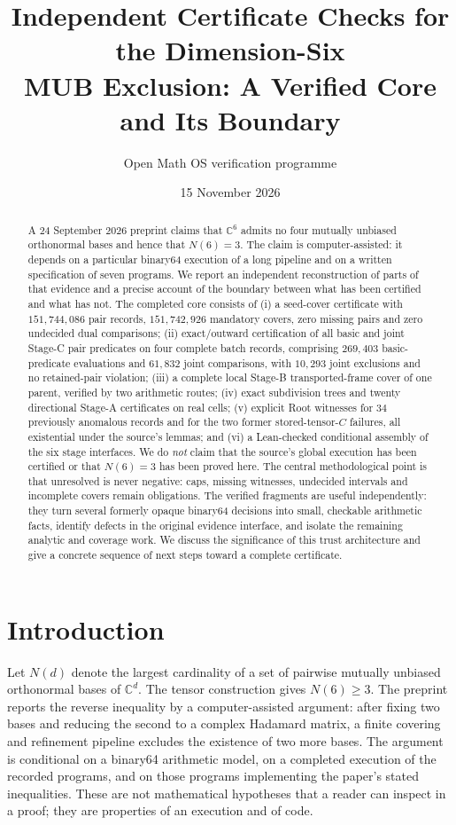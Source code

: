 \documentclass[10pt]{article}
\title{\bfseries Independent Certificate Checks for the Dimension-Six\\[2pt]
MUB Exclusion: A Verified Core and Its Boundary}
\author{Open Math OS verification programme}
\date{15 November 2026}
\theoremstyle{definition}
\newcommand{\C}{\mathbb C}
\begin{document}
\maketitle

\begin{abstract}A 24 September 2026 preprint claims that $\C^6$ admits no four mutually unbiased orthonormal bases and hence that $N(6)=3$. The claim is computer-assisted: it depends on a particular binary64 execution of a long pipeline and on a written specification of seven programs. We report an independent reconstruction of parts of that evidence and a precise account of the boundary between what has been certified and what has not. The completed core consists of (i) a seed-cover certificate with $151{,}744{,}086$ pair records, $151{,}742{,}926$ mandatory covers, zero missing pairs and zero undecided dual comparisons; (ii) exact/outward certification of all basic and joint Stage-C pair predicates on four complete batch records, comprising $269{,}403$ basic-predicate evaluations and $61{,}832$ joint comparisons, with $10{,}293$ joint exclusions and no retained-pair violation; (iii) a complete local Stage-B transported-frame cover of one parent, verified by two arithmetic routes; (iv) exact subdivision trees and twenty directional Stage-A certificates on real cells; (v) explicit Root witnesses for $34$ previously anomalous records and for the two former stored-tensor-$C$ failures, all existential under the source's lemmas; and (vi) a Lean-checked conditional assembly of the six stage interfaces. We do \emph{not} claim that the source's global execution has been certified or that $N(6)=3$ has been proved here. The central methodological point is that unresolved is never negative: caps, missing witnesses, undecided intervals and incomplete covers remain obligations. The verified fragments are useful independently: they turn several formerly opaque binary64 decisions into small, checkable arithmetic facts, identify defects in the original evidence interface, and isolate the remaining analytic and coverage work. We discuss the significance of this trust architecture and give a concrete sequence of next steps toward a complete certificate.
\end{abstract}

\section{Introduction}

Let $N(d)$ denote the largest cardinality of a set of pairwise mutually unbiased orthonormal bases of $\C^d$. The tensor construction gives $N(6)\ge 3$. The preprint \cite{source} reports the reverse inequality by a computer-assisted argument: after fixing two bases and reducing the second to a complex Hadamard matrix, a finite covering and refinement pipeline excludes the existence of two more bases. The argument is conditional on a binary64 arithmetic model, on a completed execution of the recorded programs, and on those programs implementing the paper's stated inequalities. These are not mathematical hypotheses that a reader can inspect in a proof; they are properties of an execution and of code.
\end{document}
